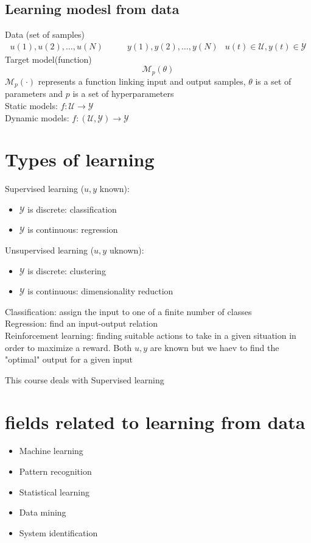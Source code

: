 \documentclass{book}
\begin{document}
\subsection{Learning modesl from data}
Data (set of samples)
\begin{align*}
    u(1), u(2),\dots, u(N) & \qquad y(1), y(2), \dots, y(N) & u(t)\in \mathcal{U},y(t)\in \mathcal{Y}
\end{align*}
Target model(function)
\[\mathcal{M}_p(\theta)
\]
\( \mathcal{M}_p(\cdot)\) represents a function linking input and output samples, $\theta$ is a set of parameters and $p$ is a set of hyperparameters\\
Static models: $f:\mathcal{U}\to\mathcal{Y}$\\
Dynamic models: $f:(\mathcal{U},\mathcal{Y})\to\mathcal{Y}$\\

\section{Types of learning}
Supervised learning ($u,y$ known):
\begin{itemize}
    \item $\mathcal{Y}$ is discrete: classification
    \item  $\mathcal{Y}$ is continuous: regression
\end{itemize}
Unsupervised learning ($u,y$  uknown):
\begin{itemize}
    \item $\mathcal{Y}$ is discrete: clustering
    \item $\mathcal{Y}$ is continuous: dimensionality reduction
\end{itemize}
Classification: assign the input to one of a finite number of classes\\
Regression: find an input-output relation\\
Reinforcement learning: finding suitable actions to take in a given situation in order to maximize a reward. Both $u,y$ are known but we haev to find the "optimal" output for a given input

This course deals with Supervised learning
\section{fields related to learning from data}
\begin{itemize}
    \item Machine learning
    \item Pattern recognition
    \item Statistical learning
    \item Data mining
    \item System identification
\end{itemize}
\end{document}
